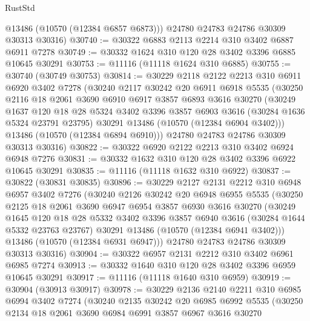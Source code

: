 \begin{lexlean}{RustStd}
\begin{coremodule}
        @13486
        (@10570 (@12384 @6857 @6873)))
      @24780
      @24783
      @24786
      @30309
      @30313
      @30316)
@30740 := @30322 @6883 @2113 @2214 @310 @3402 @6887 @6911 @7278
@30749 := @30332 @1624 @310 @120 @28 @3402 @3396 @6885 @10645 @30291
@30753 := @11116 (@11118 @1624 @310 @6885)
@30755 := @30740 (@30749 @30753)
@30814 := @30229
    @2118
    @2122
    @2213
    @310
    @6911
    @6920
    @3402
    @7278
    (@30240
      @2117
      @30242
      @20
      @6911
      @6918
      @5535
      (@30250
        @2116
        @18
        @2061
        @3690
        @6910
        @6917
        @3857
        @6893
        @3616
        @30270
        (@30249
          @1637
          @120
          @18
          @28
          @5324
          @3402
          @3396
          @3857
          @6903
          @3616
          (@30284 @1636 @5324 @23791 @23795)
          @30291
          @13486
          (@10570 (@12384 @6904 @3402)))
        @13486
        (@10570 (@12384 @6894 @6910)))
      @24780
      @24783
      @24786
      @30309
      @30313
      @30316)
@30822 := @30322 @6920 @2122 @2213 @310 @3402 @6924 @6948 @7276
@30831 := @30332 @1632 @310 @120 @28 @3402 @3396 @6922 @10645 @30291
@30835 := @11116 (@11118 @1632 @310 @6922)
@30837 := @30822 (@30831 @30835)
@30896 := @30229
    @2127
    @2131
    @2212
    @310
    @6948
    @6957
    @3402
    @7276
    (@30240
      @2126
      @30242
      @20
      @6948
      @6955
      @5535
      (@30250
        @2125
        @18
        @2061
        @3690
        @6947
        @6954
        @3857
        @6930
        @3616
        @30270
        (@30249
          @1645
          @120
          @18
          @28
          @5332
          @3402
          @3396
          @3857
          @6940
          @3616
          (@30284 @1644 @5332 @23763 @23767)
          @30291
          @13486
          (@10570 (@12384 @6941 @3402)))
        @13486
        (@10570 (@12384 @6931 @6947)))
      @24780
      @24783
      @24786
      @30309
      @30313
      @30316)
@30904 := @30322 @6957 @2131 @2212 @310 @3402 @6961 @6985 @7274
@30913 := @30332 @1640 @310 @120 @28 @3402 @3396 @6959 @10645 @30291
@30917 := @11116 (@11118 @1640 @310 @6959)
@30919 := @30904 (@30913 @30917)
@30978 := @30229
    @2136
    @2140
    @2211
    @310
    @6985
    @6994
    @3402
    @7274
    (@30240
      @2135
      @30242
      @20
      @6985
      @6992
      @5535
      (@30250
        @2134
        @18
        @2061
        @3690
        @6984
        @6991
        @3857
        @6967
        @3616
        @30270

\end{coremodule}
\end{lexlean}
